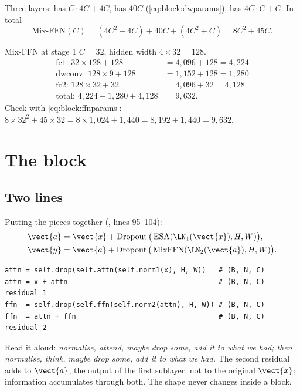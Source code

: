 Three layers:  has $C\cdot4C + 4C$,  has $40C$ (\cref{eq:block:dwparams}),
 has $4C\cdot C + C$. In total
\begin{equation}\label{eq:block:ffnparams}
  \text{Mix-FFN}(C) = (4C^2 + 4C) + 40C + (4C^2 + C) = 8C^2 + 45C .
\end{equation}

\begin{worked}[label={we:block:ffn1}]{Mix-FFN at stage 1}
$C = 32$, hidden width $4\times32 = 128$.
\begin{align*}
  \text{fc1: } 32\times128 + 128 &= 4{,}096 + 128 = 4{,}224\\
  \text{dwconv: } 128\times9 + 128 &= 1{,}152 + 128 = 1{,}280\\
  \text{fc2: } 128\times32 + 32 &= 4{,}096 + 32 = 4{,}128\\
  \text{total: } 4{,}224 + 1{,}280 + 4{,}128 &= 9{,}632 .
\end{align*}
Check with \cref{eq:block:ffnparams}: $8\times32^2 + 45\times32 = 8\times1{,}024 + 1{,}440 =
8{,}192 + 1{,}440 = 9{,}632$.
\end{worked}

\section{The block}\label{sec:block:block}

\subsection{Two lines}

Putting the pieces together (, lines 95--104):
\begin{align}
  \vect{a} &= \vect{x} + \operatorname{Dropout}\big(\operatorname{ESA}(\LN_1(\vect{x}), H, W)\big), \label{eq:block:sub1}\\
  \vect{y} &= \vect{a} + \operatorname{Dropout}\big(\operatorname{MixFFN}(\LN_2(\vect{a}), H, W)\big). \label{eq:block:sub2}
\end{align}
\begin{lstlisting}
attn = self.drop(self.attn(self.norm1(x), H, W))   # (B, N, C)
attn = x + attn                                    # (B, N, C) residual 1
ffn  = self.drop(self.ffn(self.norm2(attn), H, W)) # (B, N, C)
ffn  = attn + ffn                                  # (B, N, C) residual 2
\end{lstlisting}
Read it aloud: \emph{normalise, attend, maybe drop some, add it to what we had; then normalise,
think, maybe drop some, add it to what we had.} The second residual adds to $\vect{a}$, the output
of the first sublayer, not to the original $\vect{x}$; information accumulates through both. The
shape  never changes inside a block.

